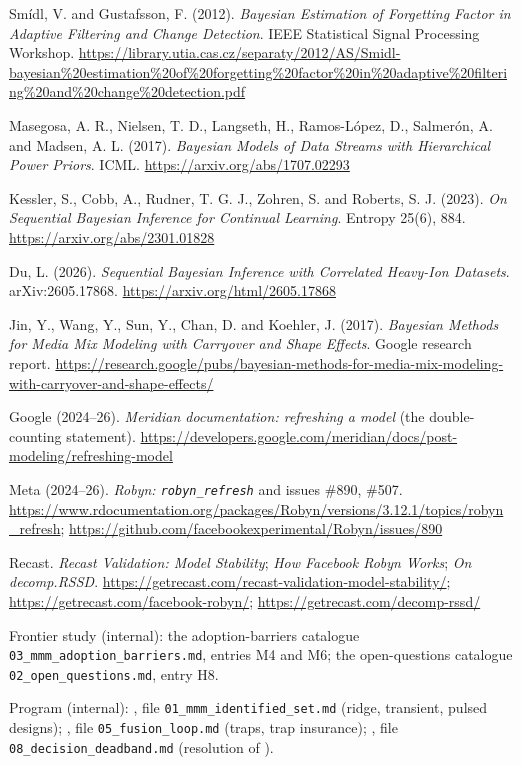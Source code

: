 \begin{enumerate}[label={[\arabic*]},leftmargin=2.5em]
\item Sm\'idl, V. and Gustafsson, F. (2012). \emph{Bayesian Estimation of Forgetting Factor in Adaptive Filtering and Change Detection}. IEEE Statistical Signal Processing Workshop. \url{https://library.utia.cas.cz/separaty/2012/AS/Smidl-bayesian%20estimation%20of%20forgetting%20factor%20in%20adaptive%20filtering%20and%20change%20detection.pdf}
\item Masegosa, A. R., Nielsen, T. D., Langseth, H., Ramos-L\'opez, D., Salmer\'on, A. and Madsen, A. L. (2017). \emph{Bayesian Models of Data Streams with Hierarchical Power Priors}. ICML. \url{https://arxiv.org/abs/1707.02293}
\item Kessler, S., Cobb, A., Rudner, T. G. J., Zohren, S. and Roberts, S. J. (2023). \emph{On Sequential Bayesian Inference for Continual Learning}. Entropy 25(6), 884. \url{https://arxiv.org/abs/2301.01828}
\item Du, L. (2026). \emph{Sequential Bayesian Inference with Correlated Heavy-Ion Datasets}. arXiv:2605.17868. \url{https://arxiv.org/html/2605.17868}
\item Jin, Y., Wang, Y., Sun, Y., Chan, D. and Koehler, J. (2017). \emph{Bayesian Methods for Media Mix Modeling with Carryover and Shape Effects}. Google research report. \url{https://research.google/pubs/bayesian-methods-for-media-mix-modeling-with-carryover-and-shape-effects/}
\item Google (2024--26). \emph{Meridian documentation: refreshing a model} (the double-counting statement). \url{https://developers.google.com/meridian/docs/post-modeling/refreshing-model}
\item Meta (2024--26). \emph{Robyn: \texttt{robyn\_refresh}} and issues \#890, \#507. \url{https://www.rdocumentation.org/packages/Robyn/versions/3.12.1/topics/robyn_refresh}; \url{https://github.com/facebookexperimental/Robyn/issues/890}
\item Recast. \emph{Recast Validation: Model Stability}; \emph{How Facebook Robyn Works}; \emph{On decomp.RSSD}. \url{https://getrecast.com/recast-validation-model-stability/}; \url{https://getrecast.com/facebook-robyn/}; \url{https://getrecast.com/decomp-rssd/}
\item Frontier study (internal): the adoption-barriers catalogue \texttt{03\_mmm\_adoption\_barriers.md}, entries M4 and M6; the open-questions catalogue \texttt{02\_open\_questions.md}, entry H8.
\item Program (internal): , file \texttt{01\_mmm\_identified\_set.md} (ridge, transient, pulsed designs); , file \texttt{05\_fusion\_loop.md} (traps, trap insurance); , file \texttt{08\_decision\_deadband.md} (resolution of ).
\end{enumerate}
\endgroup
